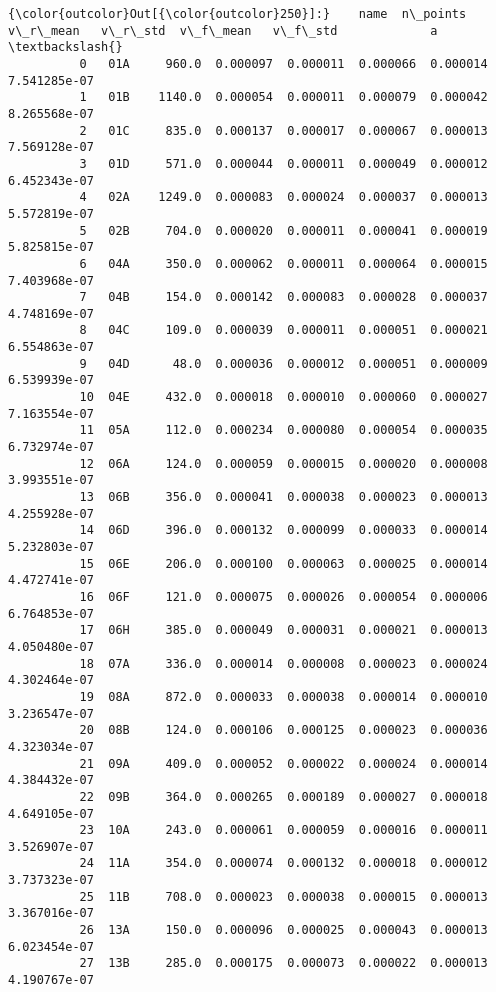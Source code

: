 \documentclass[11pt]{article}
\begin{document}
\begin{Verbatim}[commandchars=\\\{\}]
{\color{outcolor}Out[{\color{outcolor}250}]:}    name  n\_points  v\_r\_mean   v\_r\_std  v\_f\_mean   v\_f\_std             a  \textbackslash{}
          0   01A     960.0  0.000097  0.000011  0.000066  0.000014  7.541285e-07   
          1   01B    1140.0  0.000054  0.000011  0.000079  0.000042  8.265568e-07   
          2   01C     835.0  0.000137  0.000017  0.000067  0.000013  7.569128e-07   
          3   01D     571.0  0.000044  0.000011  0.000049  0.000012  6.452343e-07   
          4   02A    1249.0  0.000083  0.000024  0.000037  0.000013  5.572819e-07   
          5   02B     704.0  0.000020  0.000011  0.000041  0.000019  5.825815e-07   
          6   04A     350.0  0.000062  0.000011  0.000064  0.000015  7.403968e-07   
          7   04B     154.0  0.000142  0.000083  0.000028  0.000037  4.748169e-07   
          8   04C     109.0  0.000039  0.000011  0.000051  0.000021  6.554863e-07   
          9   04D      48.0  0.000036  0.000012  0.000051  0.000009  6.539939e-07   
          10  04E     432.0  0.000018  0.000010  0.000060  0.000027  7.163554e-07   
          11  05A     112.0  0.000234  0.000080  0.000054  0.000035  6.732974e-07   
          12  06A     124.0  0.000059  0.000015  0.000020  0.000008  3.993551e-07   
          13  06B     356.0  0.000041  0.000038  0.000023  0.000013  4.255928e-07   
          14  06D     396.0  0.000132  0.000099  0.000033  0.000014  5.232803e-07   
          15  06E     206.0  0.000100  0.000063  0.000025  0.000014  4.472741e-07   
          16  06F     121.0  0.000075  0.000026  0.000054  0.000006  6.764853e-07   
          17  06H     385.0  0.000049  0.000031  0.000021  0.000013  4.050480e-07   
          18  07A     336.0  0.000014  0.000008  0.000023  0.000024  4.302464e-07   
          19  08A     872.0  0.000033  0.000038  0.000014  0.000010  3.236547e-07   
          20  08B     124.0  0.000106  0.000125  0.000023  0.000036  4.323034e-07   
          21  09A     409.0  0.000052  0.000022  0.000024  0.000014  4.384432e-07   
          22  09B     364.0  0.000265  0.000189  0.000027  0.000018  4.649105e-07   
          23  10A     243.0  0.000061  0.000059  0.000016  0.000011  3.526907e-07   
          24  11A     354.0  0.000074  0.000132  0.000018  0.000012  3.737323e-07   
          25  11B     708.0  0.000023  0.000038  0.000015  0.000013  3.367016e-07   
          26  13A     150.0  0.000096  0.000025  0.000043  0.000013  6.023454e-07   
          27  13B     285.0  0.000175  0.000073  0.000022  0.000013  4.190767e-07   

\end{Verbatim}
\end{document}
